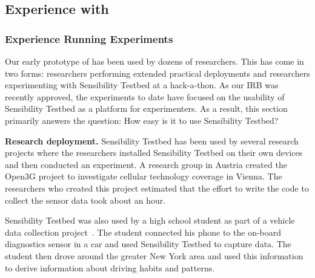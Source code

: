 
\subsection{Experience with \sysname}\label{sec-deployment}


\subsubsection{Experience Running Experiments}\label{sec-external}

Our early prototype of \sysname has been used by dozens of researchers.
This has come in two forms: researchers performing extended practical
deployments and researchers experimenting with Sensibility Testbed at a 
hack-a-thon.  As our IRB was recently approved, the experiments to date have 
focused on the usability of Sensibility Testbed as a platform for 
experimenters.
As a result, this section primarily answers the question: How easy is it to
use Sensibility Testbed?

{\bf Research deployment.}  Sensibility Testbed has been used by 
several research projects where the researchers installed Sensibility
Testbed on their own devices and then conducted an experiment.  
A research group in Austria created the Open3G \cite{open3g} project to
investigate cellular technology coverage in Vienna.  The researchers
who created this project estimated that the effort to write the code to
collect the sensor data took about an hour.

Sensibility Testbed was also used by a high school student as part of 
a vehicle data collection project~\cite{reininger2015first}.  The student
connected his phone to the on-board diagnostics sensor in a car and used Sensibility
Testbed to capture data.  The student then drove around the greater
New York area and used this information to derive information about driving
habits and patterns. 


